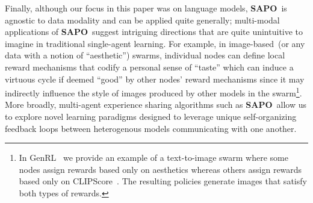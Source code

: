 \documentclass[11pt, a4paper, logo, singlecolumn, copyright]{gensyn}
\newcommand{\SAPO}{\textbf{SAPO}}
\begin{document}
Finally, although our focus in this paper was on language models, \SAPO~is agnostic to data modality and can be applied quite generally; multi-modal applications of \SAPO~suggest intriguing directions that are quite unintuitive to imagine in traditional single-agent learning. For example, in image-based~(or any data with a notion of ``aesthetic'') swarms, individual nodes can define local reward mechanisms that codify a personal sense of ``taste'' which can induce a virtuous cycle if deemed ``good'' by other nodes' reward mechanisms since it may indirectly influence the style of images produced by other models in the swarm\footnote{In GenRL~\citep{gensyn2025genrl} we provide an example of a text-to-image swarm where some nodes assign rewards based only on aesthetics whereas others assign rewards based only on CLIPScore~\citep{hessel2022clipscorereferencefreeevaluationmetric}. The resulting policies generate images that satisfy both types of rewards.}. More broadly, multi-agent experience sharing algorithms such as \SAPO~allow us to explore novel learning paradigms designed to leverage unique self-organizing feedback loops between heterogenous models communicating with one another.



\end{document}

